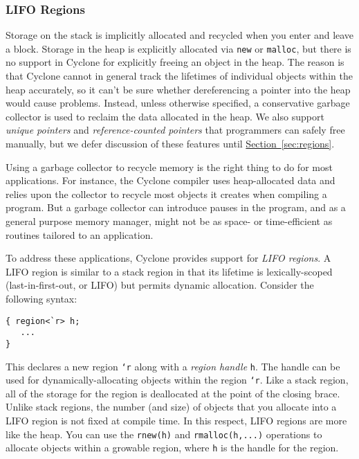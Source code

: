 \subsubsection*{LIFO Regions}

Storage on the stack is implicitly allocated and recycled when you
enter and leave a block.  Storage in the heap is explicitly allocated
via \texttt{new} or \texttt{malloc}, but there is no support in
Cyclone for explicitly freeing an object in the heap.  The reason is
that Cyclone cannot in general track the lifetimes of individual
objects within the heap accurately, so it can't be sure whether dereferencing a
pointer into the heap would cause problems.  Instead, unless otherwise
specified, a conservative
garbage collector is used to reclaim the data allocated in the heap.
We also support \emph{unique pointers} and \emph{reference-counted
  pointers} that programmers can safely free manually, but we defer
discussion of these features until
\hyperref[{sec:regions}]{Section~\ref{sec:regions}}.

Using a garbage collector to recycle memory is the right thing to do
for most applications.  For instance, the Cyclone compiler uses
heap-allocated data and relies upon the collector to recycle most
objects it creates when compiling a program.  But a garbage collector
can introduce pauses in the program, and as a general purpose memory
manager, might not be as space- or time-efficient as routines tailored
to an application.

To address these applications, Cyclone provides support for \emph{LIFO
regions}.  A LIFO region is similar to a stack region in that its
lifetime is lexically-scoped (last-in-first-out, or LIFO) but permits
dynamic allocation.  Consider the following syntax:
\begin{verbatim}
{ region<`r> h;
   ...
}
\end{verbatim}
This declares a new region \texttt{`r} along with a \emph{region handle}
\texttt{h}.  The handle can be used for dynamically-allocating objects within
the region \texttt{`r}.  Like a stack region, all of the storage for
the region is deallocated at the point of the closing brace.  
Unlike stack
regions, the number (and size) of objects that you allocate into a LIFO
region is not fixed at compile time.  In this respect, LIFO
regions are more like the heap.  You can use the \texttt{rnew(h)} and
\texttt{rmalloc(h,...)} operations to allocate objects within a growable
region, where \texttt{h} is the handle for the region.
 
